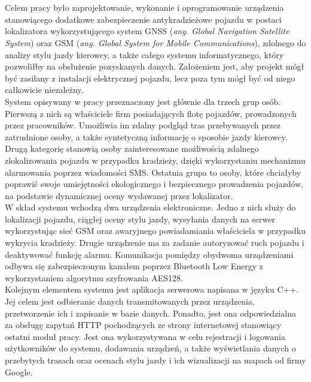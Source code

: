 \thispagestyle{empty}
\\

\\

\begin{singlespacing}

Celem pracy było zaprojektowanie, wykonanie i oprogramowanie urządzenia stanowiącego dodatkowe zabezpieczenie antykradzieżowe pojazdu w postaci lokalizatora wykorzystującego system GNSS (\textit{ang. Global Navigation Satellite System}) oraz GSM (\textit{ang. Global System for Mobile Communications}), zdolnego do analizy stylu jazdy kierowcy, a także całego systemu informatycznego, który pozwoliłby na obsłużenie pozyskanych danych. Założeniem jest, aby projekt mógł być zasilany z instalacji elektrycznej pojazdu, lecz poza tym mógł być od niego całkowicie niezależny.\\

System opisywany w pracy przeznaczony jest głównie dla trzech grup osób. Pierwszą z nich są właściciele firm posiadających flotę pojazdów, prowadzonych przez pracowników. Umożliwia im zdalny podgląd tras przebywanych przez zatrudnione osoby, a także syntetyczną informację o sposobie jazdy kierowcy. Drugą kategorię stanowią osoby zainteresowane możliwością zdalnego zlokalizowania pojazdu w przypadku kradzieży, dzięki wykorzystaniu mechanizmu alarmowania poprzez wiadomości SMS. Ostatnia grupa to osoby, które chciałyby poprawić swoje umiejętności ekologicznego i bezpiecznego prowadzenia pojazdów, na podstawie dynamicznej oceny wydawanej przez lokalizator. \\

W skład systemu wchodzą dwa urządzenia elektroniczne. Jedno z nich służy do lokalizacji pojazdu, ciągłej oceny stylu jazdy, wysyłania danych na serwer wykorzystując sieć GSM oraz awaryjnego powiadamiania właściciela w przypadku wykrycia kradzieży. Drugie urządzenie ma za zadanie autoryzować ruch pojazdu i deaktywować funkcję alarmu. Komunikacja pomiędzy obydwoma urządzeniami odbywa się zabezpieczonym kanałem poprzez Bluetooth Low Energy z wykorzystaniem algorytmu szyfrowania AES128. \\

Kolejnym elementem systemu jest aplikacja serwerowa napisana w języku C++. Jej celem jest odbieranie danych transmitowanych przez urządzenia, przetworzenie ich i zapisanie w bazie danych. Ponadto, jest ona odpowiedzialna za obsługę zapytań HTTP pochodzących ze strony internetowej stanowiący ostatni moduł pracy. Jest ona wykorzystywana w celu rejestracji i logowania użytkowników do systemu, dodawania urządzeń, a także wyświetlania danych o przebytych trasach oraz ocenach stylu jazdy i ich wizualizacji na mapach od firmy Google. \\


\end{singlespacing}
